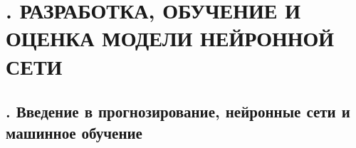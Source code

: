 \setcounter{chaptercntr}{4}


\sectionbreak \section*{
  \gostTitleFont
  \redline
  \thechaptercntr .
   РАЗРАБОТКА, ОБУЧЕНИЕ И ОЦЕНКА МОДЕЛИ НЕЙРОННОЙ СЕТИ
}

\titlespace

\subsection*{ 
	\gostTitleFont
	\redline
	\thechaptercntr .\thesubchaptercntr \spc
	Введение в прогнозирование, нейронные сети и машинное обучение
} \addtocounter{subchaptercntr}{1}

\subtitlespace

